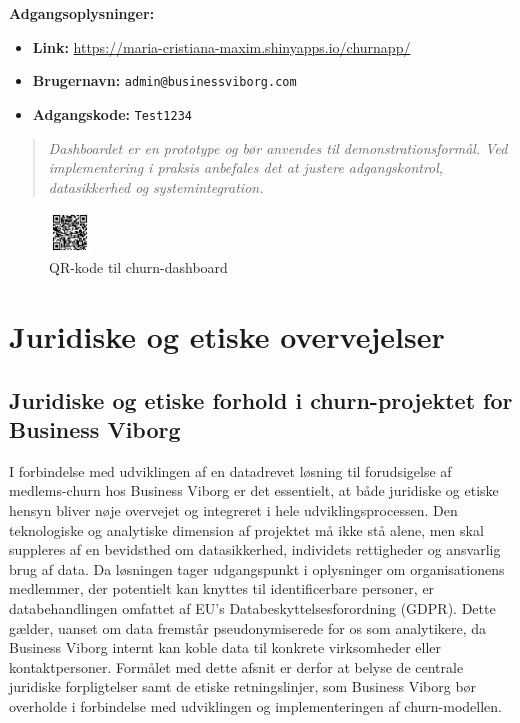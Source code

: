 \documentclass[
  11pt,
  letterpaper,
  DIV=11,
  numbers=noendperiod]{scrartcl}
\providecommand{\tightlist}{%
  \setlength{\itemsep}{0pt}\setlength{\parskip}{0pt}}\usepackage{longtable,booktabs,array}
\begin{document}
\textbf{Adgangsoplysninger:}

\begin{itemize}
\tightlist
\item
  \textbf{Link:}
  \url{https://maria-cristiana-maxim.shinyapps.io/churnapp/}\\
\item
  \textbf{Brugernavn:} \texttt{admin@businessviborg.com}\\
\item
  \textbf{Adgangskode:} \texttt{Test1234}
\end{itemize}

\begin{quote}
\emph{Dashboardet er en prototype og bør anvendes til
demonstrationsformål. Ved implementering i praksis anbefales det at
justere adgangskontrol, datasikkerhed og systemintegration.}
\end{quote}

\begin{figure}[H]

{\centering \includegraphics[width=0.1\textwidth,height=\textheight]{images/churn_dashboard_qr.png}

}

\caption{QR-kode til churn-dashboard}

\end{figure}%

\section{Juridiske og etiske
overvejelser}\label{juridiske-og-etiske-overvejelser}

\subsection{Juridiske og etiske forhold i churn-projektet for Business
Viborg}\label{juridiske-og-etiske-forhold-i-churn-projektet-for-business-viborg}

I forbindelse med udviklingen af en datadrevet løsning til forudsigelse
af medlems-churn hos Business Viborg er det essentielt, at både
juridiske og etiske hensyn bliver nøje overvejet og integreret i hele
udviklingsprocessen. Den teknologiske og analytiske dimension af
projektet må ikke stå alene, men skal suppleres af en bevidsthed om
datasikkerhed, individets rettigheder og ansvarlig brug af data. Da
løsningen tager udgangspunkt i oplysninger om organisationens medlemmer,
der potentielt kan knyttes til identificerbare personer, er
databehandlingen omfattet af EU's Databeskyttelsesforordning (GDPR).
Dette gælder, uanset om data fremstår pseudonymiserede for os som
analytikere, da Business Viborg internt kan koble data til konkrete
virksomheder eller kontaktpersoner. Formålet med dette afsnit er derfor
at belyse de centrale juridiske forpligtelser samt de etiske
retningslinjer, som Business Viborg bør overholde i forbindelse med
udviklingen og implementeringen af churn-modellen.
\end{document}
